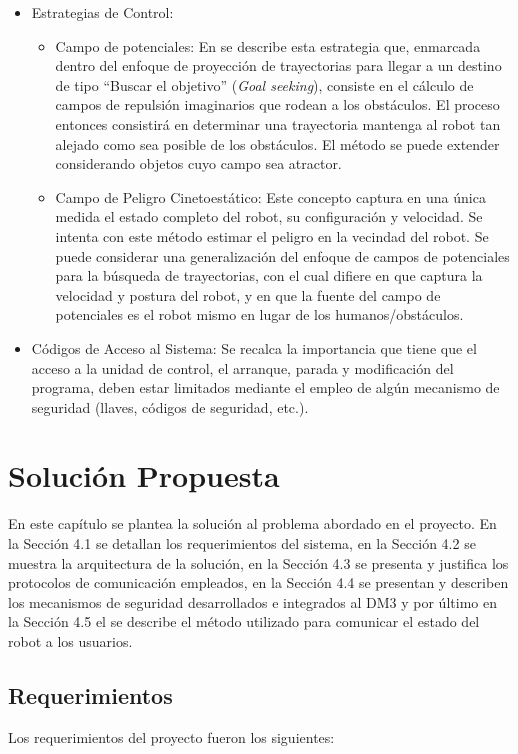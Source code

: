 \documentclass[withindex,glossary]{cam-thesis}
\begin{document}
\begin{itemize}
\begin{itemize}
  \end {itemize}
\item Estrategias de Control:
  \begin{itemize}
  	\item Campo de potenciales: En \cite{MartinezSisto2009} se describe esta estrategia que, enmarcada dentro del enfoque de proyección de trayectorias para llegar a un destino de tipo ``Buscar el objetivo'' (\textit{Goal seeking}), consiste en el cálculo de campos de repulsión imaginarios que rodean a los obstáculos. El proceso entonces consistirá en determinar una trayectoria mantenga al robot tan alejado como sea posible de los obstáculos. El método se puede extender considerando objetos cuyo campo sea atractor.
  	\item Campo de Peligro Cinetoestático: Este concepto captura en una única medida el estado completo del robot, su configuración y velocidad. Se intenta con este método  estimar el peligro en la vecindad del robot. Se puede considerar una generalización del enfoque de campos de potenciales para la búsqueda de trayectorias, con el cual difiere en que captura la velocidad y postura del robot, y en que la fuente del campo de potenciales es el robot mismo en lugar de los humanos/obstáculos.
  \end{itemize}
\item Códigos de Acceso al Sistema: Se recalca la importancia que tiene que el acceso a la unidad de control, el arranque, parada y modificación del programa, deben estar limitados mediante el empleo de algún mecanismo de seguridad (llaves, códigos de seguridad, etc.).
\end{itemize}

\chapter{Solución Propuesta}
En este capítulo se plantea la solución al problema abordado en el proyecto. En la Sección 4.1 se detallan los requerimientos del sistema, en la Sección 4.2 se muestra la arquitectura de la solución, en la Sección 4.3 se presenta y justifica los protocolos de comunicación empleados, en la Sección 4.4 se presentan y describen los mecanismos de seguridad desarrollados e integrados al DM3 y por último en la Sección 4.5 el se describe el método utilizado para comunicar el estado del robot a los usuarios.

\section{Requerimientos} \label{sec:Sol Prop :: Requerimientos}
Los requerimientos del proyecto fueron los siguientes:
\end{document}
